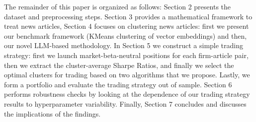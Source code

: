 The remainder of this paper is organized as follows: Section 2 presents the dataset and preprocessing steps. Section 3 provides a mathematical framework to treat news articles, Section 4 focuses on clustering news articles: first we present our benchmark framework (KMeans clustering of vector embeddings) and then, our novel LLM-based methodology. In Section 5 we construct a simple trading strategy: first we launch market-beta-neutral positions for each firm-article pair, then we extract the cluster-average Sharpe Ratios, and finally we select the optimal clusters for trading based on two algorithms that we propose. Lastly, we form a portfolio and evaluate the trading strategy out of sample. Section 6 performs robustness checks by looking at the dependence of our trading strategy results to hyperparameter variability. Finally, Section 7 concludes and discusses the implications of the findings.
